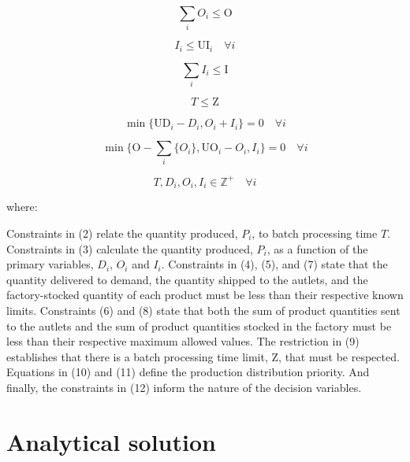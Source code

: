 \documentclass[authoryear,manuscript,12pt]{elsarticle}
\begin{document}
\begin{equation}
\sum_i{O_i} \leq \textrm{O}
\end{equation}

\begin{equation}
I_i \leq \textrm{UI}_i \quad \forall i
\end{equation}

\begin{equation}
\sum_i{I_i} \leq \textrm{I}
\end{equation}

\begin{equation}
T \leq \textrm{Z}
\end{equation}

\begin{equation}
\min \{\textrm{UD}_i - D_i, O_i + I_i\} = 0 \quad \forall i
\end{equation}

\begin{equation}
\min\{\textrm{O} - \sum_i\{ O_i\}, \textrm{UO}_i - O_i, I_i\} = 0 \quad \forall i
\end{equation}

\begin{equation}
\label{MBPTMP10}
T, D_i, O_i, I_i \in  \mathbb{Z}^+ \quad \forall i
\end{equation}

where:

Constraints in (2) relate the quantity produced, $P_i$, to batch processing time $T$. Constraints in (3) calculate the quantity produced, $P_i$, as a function of the primary variables, $D_i$, $O_i$ and $I_i$. Constraints in (4), (5), and (7) state that the quantity delivered to demand, the quantity shipped to the autlets, and the factory-stocked quantity of each product must be less than their respective known limits. Constraints (6) and (8) state that both the sum of product quantities sent to the autlets and the sum of product quantities stocked in the factory must be less than their respective maximum allowed values. The restriction in (9) establishes that there is a batch processing time limit, $\textrm{Z}$, that must be respected. Equations in (10) and (11) define the production distribution priority. And finally, the constraints in (12) inform the nature of the decision variables.

\section{Analytical solution}
\label{sec:analyticalSol}
\end{document}
